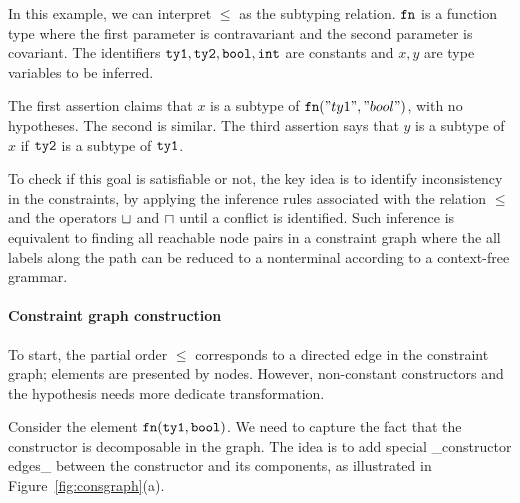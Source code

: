 In this example, we can interpret $\leq$ as the subtyping relation. $\mathtt{fn}$ is
a function type where the first parameter is contravariant and the second
parameter is covariant. The identifiers $\mathtt{ty1}, \mathtt{ty2}, \mathtt{bool},
\mathtt{int}$ are constants and $x, y$ are type variables to be inferred.

The first assertion claims that $x$ is a subtype of $\mathtt{fn} ("ty1",
"bool")$, with no hypotheses. The second is similar.
The third assertion says that $y$ is a subtype of $x$ if $\mathtt{ty2}$ is
a subtype of $\mathtt{ty1}$.

To check if this goal is satisfiable or not, the key idea is to
identify inconsistency in the constraints, by applying the inference
rules associated with the relation $\leq$ and the operators $\sqcup$
and $\sqcap$ until a conflict is identified. Such
inference is equivalent to finding all reachable node pairs in a
constraint graph where the all labels along the path can be reduced to
a nonterminal according to a context-free grammar.

\paragraph{Constraint graph construction}
To start, the partial order $\leq$ corresponds to a directed edge in
the constraint graph; elements are presented by nodes. However,
non-constant constructors and the hypothesis needs more dedicate
transformation.

Consider the element $\mathtt{fn} (\mathtt{ty1}, \mathtt{bool})$. We need to capture
the fact that the constructor is decomposable in the graph. The idea is to add
special _constructor edges_ between the constructor and its
components, as illustrated in Figure~\ref{fig:consgraph}(a).

